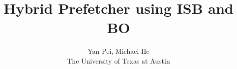 \documentclass[letterpaper,keeplastbox,twoside,10pt]{article}
\begin{document}
\title{\Large Hybrid Prefetcher using ISB and BO}
\author{\rm Yan Pei, Michael He\\The University of Texas at Austin}

\maketitle


\tableofcontents

\newpage

\newpage

\newpage

\newpage

\newpage

\newpage

\newpage

\newpage


\newpage


\end{document}
